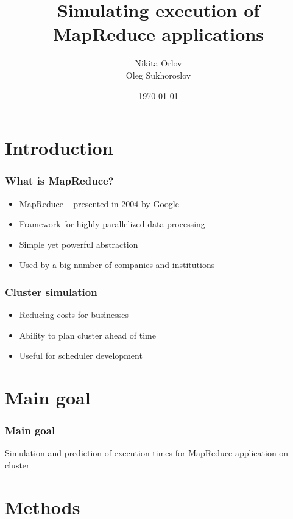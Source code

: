 \documentclass{beamer}
\title{Simulating execution of MapReduce applications}
\author{Nikita Orlov\\ Oleg Sukhoroslov}
\institute{HSE University}
\date{\today}
\begin{document}
    \begin{frame}
        \titlepage
    \end{frame}

    \section{Introduction}
    
    \begin{frame}
        \frametitle{What is MapReduce?}
        \begin{itemize}
            \item<1-> MapReduce -- presented in 2004 by Google
            \item<2-> Framework for highly parallelized data processing
            \item<3-> Simple yet powerful abstraction
            \item<4-> Used by a big number of companies and institutions 
        \end{itemize}
    \end{frame}

    \begin{frame}
        \frametitle{Cluster simulation}
        \begin{itemize}
            \item<1-> Reducing costs for businesses
            \item<2-> Ability to plan cluster ahead of time 
            \item<3-> Useful for scheduler development
        \end{itemize}
    \end{frame}
    
    \section{Main goal}

    \begin{frame}
        \frametitle{Main goal}
        \begin{center}
            Simulation and prediction of execution times for MapReduce
            application on cluster
        \end{center}
    \end{frame}

    \section{Methods}
\end{document}

